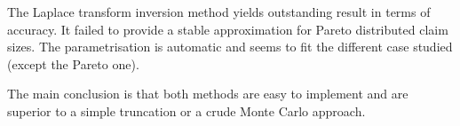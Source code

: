 The Laplace transform inversion method yields outstanding result in terms of accuracy. It failed to provide a stable approximation for Pareto distributed claim sizes. The parametrisation is automatic and seems to fit the different case studied (except the Pareto one).

The main conclusion is that both methods are easy to implement and are superior to a simple truncation or a crude Monte Carlo approach.